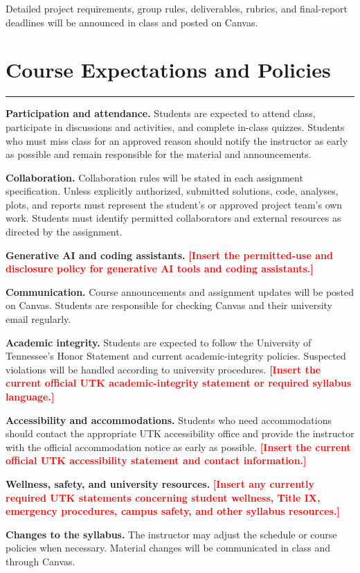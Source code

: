 \documentclass[11pt]{article}
\newcommand{\sectionrule}{\vspace{-0.4em}\color{utorange}\rule{\linewidth}{0.8pt}\color{black}}
\newcommand{\placeholder}[1]{\textcolor{red}{\textbf{[#1]}}}
\begin{document}
Detailed project requirements, group rules, deliverables, rubrics, and final-report deadlines will be announced in class and posted on Canvas.

\section*{Course Expectations and Policies}
\sectionrule

\textbf{Participation and attendance.} Students are expected to attend class, participate in discussions and activities, and complete in-class quizzes. Students who must miss class for an approved reason should notify the instructor as early as possible and remain responsible for the material and announcements.

\textbf{Collaboration.} Collaboration rules will be stated in each assignment specification. Unless explicitly authorized, submitted solutions, code, analyses, plots, and reports must represent the student's or approved project team's own work. Students must identify permitted collaborators and external resources as directed by the assignment.

\textbf{Generative AI and coding assistants.} \placeholder{Insert the permitted-use and disclosure policy for generative AI tools and coding assistants.}

\textbf{Communication.} Course announcements and assignment updates will be posted on Canvas. Students are responsible for checking Canvas and their university email regularly.

\textbf{Academic integrity.} Students are expected to follow the University of Tennessee's Honor Statement and current academic-integrity policies. Suspected violations will be handled according to university procedures. \placeholder{Insert the current official UTK academic-integrity statement or required syllabus language.}

\textbf{Accessibility and accommodations.} Students who need accommodations should contact the appropriate UTK accessibility office and provide the instructor with the official accommodation notice as early as possible. \placeholder{Insert the current official UTK accessibility statement and contact information.}

\textbf{Wellness, safety, and university resources.} \placeholder{Insert any currently required UTK statements concerning student wellness, Title IX, emergency procedures, campus safety, and other syllabus resources.}

\textbf{Changes to the syllabus.} The instructor may adjust the schedule or course policies when necessary. Material changes will be communicated in class and through Canvas.
\end{document}
